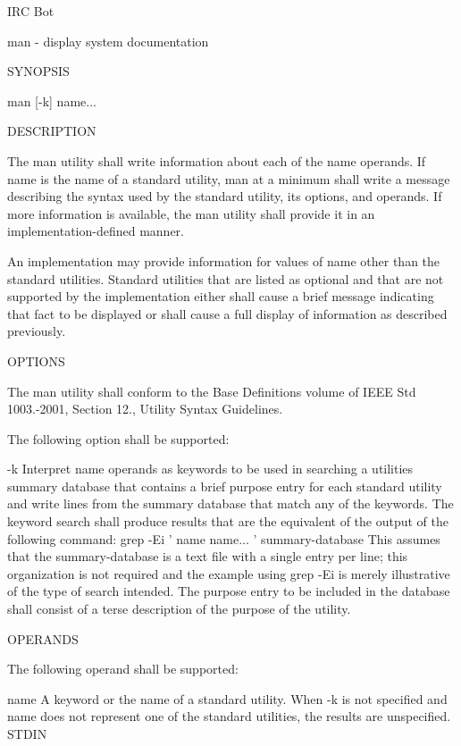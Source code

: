I\-R\-C Bot \begin{DoxyVerb}man - display system documentation
\end{DoxyVerb}


S\-Y\-N\-O\-P\-S\-I\-S \begin{DoxyVerb}man [-k] name...
\end{DoxyVerb}


D\-E\-S\-C\-R\-I\-P\-T\-I\-O\-N

The man utility shall write information about each of the name operands. If name is the name of a standard utility, man at a minimum shall write a message describing the syntax used by the standard utility, its options, and operands. If more information is available, the man utility shall provide it in an implementation-\/defined manner.

An implementation may provide information for values of name other than the standard utilities. Standard utilities that are listed as optional and that are not supported by the implementation either shall cause a brief message indicating that fact to be displayed or shall cause a full display of information as described previously.

O\-P\-T\-I\-O\-N\-S

The man utility shall conform to the Base Definitions volume of I\-E\-E\-E Std 1003.-\/2001, Section 12., Utility Syntax Guidelines.

The following option shall be supported\-:

-\/k Interpret name operands as keywords to be used in searching a utilities summary database that contains a brief purpose entry for each standard utility and write lines from the summary database that match any of the keywords. The keyword search shall produce results that are the equivalent of the output of the following command\-: grep -\/\-Ei ' name name... ' summary-\/database This assumes that the summary-\/database is a text file with a single entry per line; this organization is not required and the example using grep -\/\-Ei is merely illustrative of the type of search intended. The purpose entry to be included in the database shall consist of a terse description of the purpose of the utility.

O\-P\-E\-R\-A\-N\-D\-S

The following operand shall be supported\-:

name A keyword or the name of a standard utility. When -\/k is not specified and name does not represent one of the standard utilities, the results are unspecified. S\-T\-D\-I\-N

